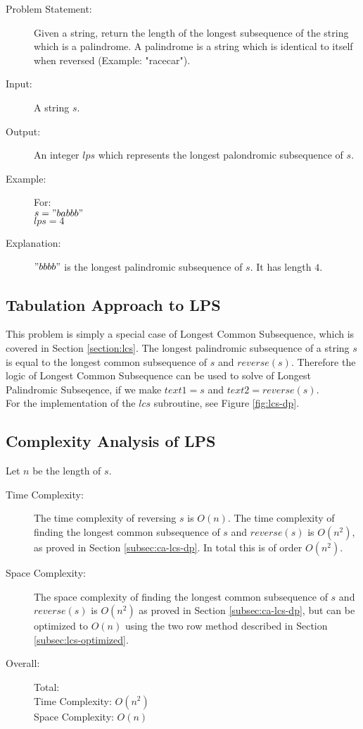 \begin{description}
    \item[Problem Statement:]
        Given a string, return the length of the longest subsequence of the string which is a palindrome. A palindrome is a string which is identical to itself when reversed (Example: "racecar").
    
    \item[Input:]
        A string $s$.
        
    \item[Output:]
        An integer $lps$ which represents the longest palondromic subsequence of $s$.
        
    \item[Example:] For:\\
        $s = "babbb"$\\
        $lps = 4$
        
    \item[Explanation:]
        $"bbbb"$ is the longest palindromic subsequence of $s$. It has length $4$.
\end{description}

\subsection{Tabulation Approach to LPS}
This problem is simply a special case of Longest Common Subsequence,
which is covered in Section \ref{section:lcs}.
The longest palindromic subsequence of a string $s$ is equal to the longest common subsequence of $s$ and $reverse(s)$.
Therefore the logic of Longest Common Subsequence can be used to solve of Longest Palindromic Subseqence, if we make $text1=s$ and $text2=reverse(s)$.\\
For the implementation of the $lcs$ subroutine, see Figure \ref{fig:lcs-dp}.

\subsection{Complexity Analysis of LPS}
Let $n$ be the length of $s$.
\begin{description}
    \item[Time Complexity:]
        The time complexity of reversing $s$ is $O(n)$.
        The time complexity of finding the longest common subsequence of $s$ and $reverse(s)$ is $O(n^2)$, as proved in Section \ref{subsec:ca-lcs-dp}.
        In total this is of order $O(n^2)$.
        
    \item[Space Complexity:] 
        The space complexity of finding the longest common subsequence of $s$ and $reverse(s)$ is $O(n^2)$ as proved in Section \ref{subsec:ca-lcs-dp},
        but can be optimized to $O(n)$ using the two row method described in Section \ref{subsec:lcs-optimized}.
        
    \item[Overall:] Total:\\
        Time Complexity: $O(n^2)$\\
        Space Complexity: $O(n)$
    
\end{description}